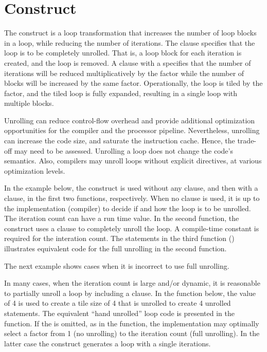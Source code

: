 \pagebreak
\section{ Construct}
\label{sec:unroll}

The  construct is a loop transformation that increases the 
number of loop blocks in a loop, while reducing the number of iterations.
The  clause specifies that the loop is to be completely unrolled.  
That is, a loop block for each iteration is created, and the loop is removed.
A  clause  with a  specifies that the number of 
iterations will be reduced multiplicatively by the factor while the number of 
blocks will be increased by the same factor.  
Operationally, the loop is tiled by the factor, and the tiled loop is 
fully expanded, resulting in a single loop with multiple blocks.

Unrolling can reduce control-flow overhead and provide additional
optimization opportunities for the compiler and the processor
pipeline. Nevertheless, unrolling can increase the code size, and saturate
the instruction cache. Hence, the trade-off may need to be assessed.
Unrolling a loop does not change the code's semantics. Also, compilers
may unroll loops without explicit directives, at various optimization levels.

In the example below, the  construct is used without any clause, and then
with a  clause, in the first two functions, respectively.
When no clause is used, it is up to the implementation (compiler) 
to decide if and how the loop is to be unrolled.  
The iteration count can have a run time value.  
In the second function, the  construct uses a  clause
to completely unroll the loop.  A compile-time constant is required for the interation count.
The statements in the third function () illustrates
equivalent code for the full unrolling in the second function.



The next example shows cases when it is incorrect to use full unrolling.


In many cases, when the iteration count is large and/or dynamic, it is
reasonable to partially unroll a loop by including a  clause.
In the  function below, the  value
of 4 is used to create a tile size of 4 that is unrolled to create 4 unrolled statements.
The equivalent ``hand unrolled'' loop code is presented in the 
 function.
If the  is omitted, as in the  
function, the implementation may optimally select a factor from 1 
(no unrolling) to the iteration count (full unrolling).  
In the latter case the construct generates a loop with a single iterations.

